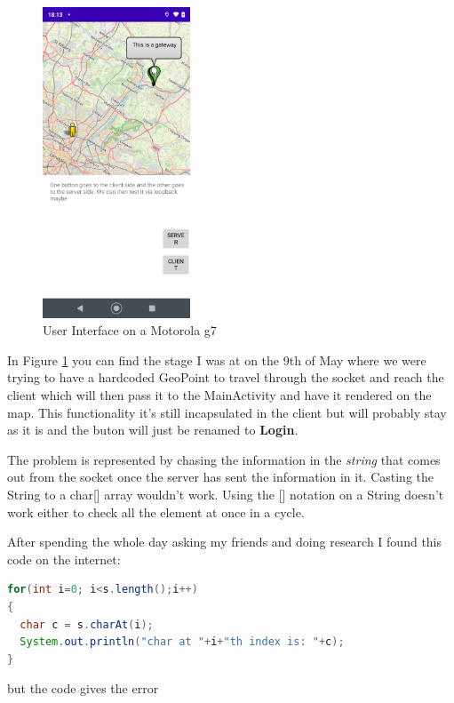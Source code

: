 \documentclass[a4paper,12pt]{book}
\begin{document}
\begin{figure}
\includegraphics[width=4.4cm]{./current_status_g7.PNG}
\caption{User Interface on a Motorola g7}\label{fig:User-Interface-g7}
\end{figure}

In Figure \ref{fig:User-Interface-g7} you can find the stage I was at on the 9th of May where we were trying to have a hardcoded GeoPoint to travel through the socket and reach the client which will then pass it to the MainActivity and have it rendered on the map. This functionality it's still incapsulated in the client but will probably stay as it is and the buton will just be renamed to \textbf{Login}.

The problem is represented by chasing the information in the \emph{string} that comes out from the socket once the server has sent the information in it. Casting the String to a char[] array wouldn't work. Using the [] notation on a String doesn't work either to check all the element at once in a cycle. 


After spending the whole day asking my friends and doing research I found this code on the internet:

\begin{lstlisting}[language=java]
for(int i=0; i<s.length();i++)
{
  char c = s.charAt(i);
  System.out.println("char at "+i+"th index is: "+c);
}
\end{lstlisting}

but the code gives the error
\end{document}
